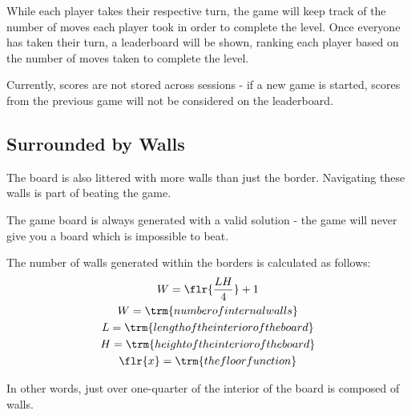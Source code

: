\documentclass{article}
\begin{document}
While each player takes their respective turn, the game will keep track of the number of moves
each player took in order to complete the level. Once everyone has taken their turn, a leaderboard
will be shown, ranking each player based on the number of moves taken to complete the level.

Currently, scores are not stored across sessions - if a new game is started, scores from the
previous game will not be considered on the leaderboard.

\subsection{Surrounded by Walls}

The board is also littered with more walls than just the border. Navigating these walls is part
of beating the game.

The game board is always generated with a valid solution - the game will never give you a board
which is impossible to beat.

The number of walls generated within the borders is calculated as follows:
\begin{gather*}
    W = \flr{\frac{LH}{4}} + 1 \\
    W = \trm{number of internal walls} \\
    L = \trm{length of the interior of the board} \\
    H = \trm{height of the interior of the board} \\
    \flr{x} = \trm{the floor function}
\end{gather*}

In other words, just over one-quarter of the interior of the board is composed of walls.
\end{document}
